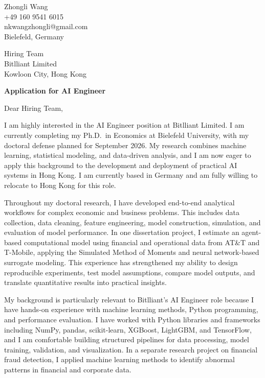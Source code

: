 \documentclass[11pt]{article}
\begin{document}
\begin{flushright}
Zhongli Wang \\
+49 160 9541 6015 \\
nkwangzhongli@gmail.com \\
Bielefeld, Germany \\
\end{flushright}

\vspace{0.1cm}

\noindent
Hiring Team \\
Bitlliant Limited \\
Kowloon City, Hong Kong \\

\vspace{0.1cm}

\noindent
\textbf{Application for AI Engineer} \\

\vspace{0.05cm}

\noindent Dear Hiring Team,

I am highly interested in the AI Engineer position at Bitlliant Limited. I am currently completing my Ph.D.\ in Economics at Bielefeld University, with my doctoral defense planned for September 2026. My research combines machine learning, statistical modeling, and data-driven analysis, and I am now eager to apply this background to the development and deployment of practical AI systems in Hong Kong. I am currently based in Germany and am fully willing to relocate to Hong Kong for this role.

Throughout my doctoral research, I have developed end-to-end analytical workflows for complex economic and business problems. This includes data collection, data cleaning, feature engineering, model construction, simulation, and evaluation of model performance. In one dissertation project, I estimate an agent-based computational model using financial and operational data from AT\&T and T-Mobile, applying the Simulated Method of Moments and neural network-based surrogate modeling. This experience has strengthened my ability to design reproducible experiments, test model assumptions, compare model outputs, and translate quantitative results into practical insights.

My background is particularly relevant to Bitlliant's AI Engineer role because I have hands-on experience with machine learning methods, Python programming, and performance evaluation. I have worked with Python libraries and frameworks including NumPy, pandas, scikit-learn, XGBoost, LightGBM, and TensorFlow, and I am comfortable building structured pipelines for data processing, model training, validation, and visualization. In a separate research project on financial fraud detection, I applied machine learning methods to identify abnormal patterns in financial and corporate data. 
\end{document}
